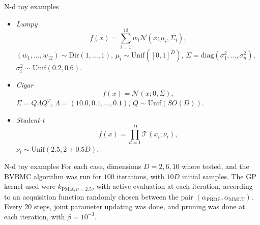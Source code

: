 \documentclass{beamer}
\begin{document}
\begin{frame}
\begin{block}{N-d toy examples}
\begin{itemize}
	\item \textit{Lumpy}
	\begin{equation*}
	f(x) = \sum_{i=1}^{12} w_i \mathcal{N}(x;\mu_i,\Sigma_i),
	\end{equation*}
	$(w_1,\ldots,w_{12}) \sim \text{Dir}(1,\ldots,1)$, $\mu_i \sim \text{Unif}([0,1]^D)$, $\Sigma = \text{diag}(\sigma_1^2,\ldots,\sigma_n^2)$, $\sigma_i^2 \sim \text{Unif}(0.2,0.6)$.
	
	\item \textit{Cigar}
	\begin{equation*}
	f(x) = \mathcal{N}(x;0,\Sigma),
	\end{equation*}
	$\Sigma = Q \Lambda Q^T$, $\Lambda = (10.0,0.1,\ldots,0.1)$, $Q \sim \text{Unif}(SO(D))$.
	
	\item \textit{Student-t} 
	\begin{equation*}
	f(x) =  \prod_{d=1}^D \mathcal{T}(x_i;\nu_i),
	\end{equation*}
	$\nu_i \sim \text{Unif}(2.5,2+0.5D)$.
\end{itemize}
\end{block}
\end{frame}
\begin{frame}
\begin{block}{N-d toy examples}
For each case, dimensions $D = 2,6,10$ where tested, and the BVBMC algorithm was run for $100$ iterations, with $10D$ initial samples. The GP kernel used were $k_{\text{PMat},\nu=2.5}$, with active evaluation at each iteration, according to an acquisition function randomly chosen between the pair $(\alpha_\text{PROP},\alpha_\text{MMLT})$. Every 20 steps, joint parameter updating was done, and pruning was done at each iteration, with $\beta = 10^{-3}$.
\end{block}
\end{frame}
\end{document}
